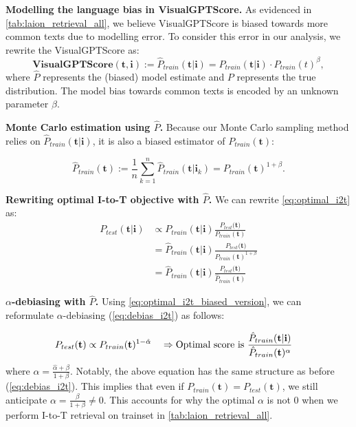 \documentclass{article} \usepackage{iclr2024_conference,times}
\begin{document}
{\bf Modelling the language bias in VisualGPTScore.} As evidenced in \autoref{tab:laion_retrieval_all}, we believe VisualGPTScore is biased towards more common texts due to modelling error. To consider this error in our analysis, we rewrite the VisualGPTScore as:
\begin{equation}
    \textbf{VisualGPTScore}(\mathbf{t}, \mathbf{i}) := \hat{P}_{train}(\mathbf{t} | \mathbf{i}) = P_{train}(\mathbf{t} | \mathbf{i}) \cdot P_{train}(t)^{\beta},
\end{equation}
where $\hat{P}$ represents the (biased) model estimate and $P$ represents the true distribution. The model bias towards common texts is encoded by an unknown parameter $\beta$.


{\bf Monte Carlo estimation using $\hat{P}$.} Because our Monte Carlo sampling method relies on $\hat{P}_{train}(\mathbf{t}|\mathbf{i})$, it is also a biased estimator of $P_{train}(\mathbf{t})$:

\begin{equation}
    \hat{P}_{train}(\mathbf{t}) := \frac{1}{n} \sum_{k=1}^n \hat{P}_{train}(\mathbf{t} | \mathbf{i}_k) = P_{train}(\mathbf{t})^{1+\beta}.
\end{equation}

{\bf Rewriting optimal I-to-T objective with $\hat{P}$.} We can rewrite \autoref{eq:optimal_i2t} as:
\begin{align} 
    P_{test}(\mathbf{t}|\mathbf{i}) &\propto {P}_{train}(\mathbf{t}|\mathbf{i}) \frac{P_{test}(\mathbf{t)}}{P_{train}(\mathbf{t})} \\
&= \hat{P}_{train}(\mathbf{t}|\mathbf{i}) \frac{P_{test}(\mathbf{t)}}{P_{train}(\mathbf{t})^{1+\beta}} \\
    &= \hat{P}_{train}(\mathbf{t} | \mathbf{i}) \frac{P_{test}(\mathbf{t)}}{\hat{P}_{train}(\mathbf{t})} 
\label{eq:optimal_i2t_biased_version}
\end{align}


{\bf $\alpha$-debiasing with $\hat{P}$.} Using \autoref{eq:optimal_i2t_biased_version}, we can reformulate $\alpha$-debiasing (\autoref{eq:debias_i2t}) as follows:

\begin{align}
P_{test}(\mathbf{t}) \propto P_{train}(\mathbf{t})^{1-\hat{\alpha}} \quad \Rightarrow \text{Optimal score is }& \frac{\hat{P}_{train}(\mathbf{t} | \mathbf{i})}{\hat{P}_{train}({\bf t})^{\alpha}}
\label{eq:debias_i2t_bias}
\end{align}
where $\alpha = \frac{\hat{\alpha} + \beta}{1 + \beta}$. Notably, the above equation has the same structure as before (\autoref{eq:debias_i2t}). This implies that even if $P_{train}(\mathbf{t}) = P_{test}(\mathbf{t})$, we still anticipate $\alpha = \frac{\beta}{1+\beta} \neq 0$. This accounts for why the optimal $\alpha$ is not 0 when we perform I-to-T retrieval on trainset in \autoref{tab:laion_retrieval_all}. 
\end{document}
